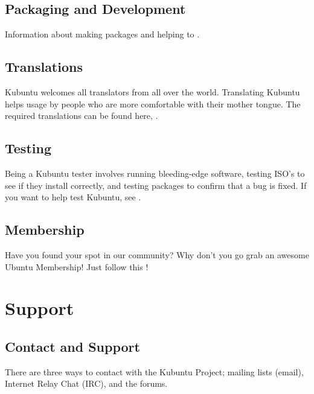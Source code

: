 \documentclass[letterpaper,10pt,english]{sphinxmanual}
\begin{document}
\section{Packaging and Development}
\label{\detokenize{docs/contribute:packaging-and-development}}
Information about making packages and helping to .


\section{Translations}
\label{\detokenize{docs/contribute:translations}}
Kubuntu welcomes all translators from all over the world. Translating Kubuntu helps usage by people who are more comfortable with their mother tongue. The required translations can be found here, .


\section{Testing}
\label{\detokenize{docs/contribute:testing}}
Being a Kubuntu tester involves running bleeding-edge software, testing ISO's to see if they install correctly, and testing packages to confirm that a bug is fixed. If you want to help test Kubuntu, see .


\section{Membership}
\label{\detokenize{docs/contribute:membership}}
Have you found your spot in our community? Why don't you go grab an awesome Ubuntu Membership! Just follow this !


\chapter{Support}
\label{\detokenize{docs/support::doc}}\label{\detokenize{docs/support:support}}\label{\detokenize{docs/support:support-link}}

\section{Contact and Support}
\label{\detokenize{docs/support:contact-and-support}}
There are three ways to contact with the Kubuntu Project; mailing lists (email), Internet Relay Chat (IRC), and the forums.
\end{document}
